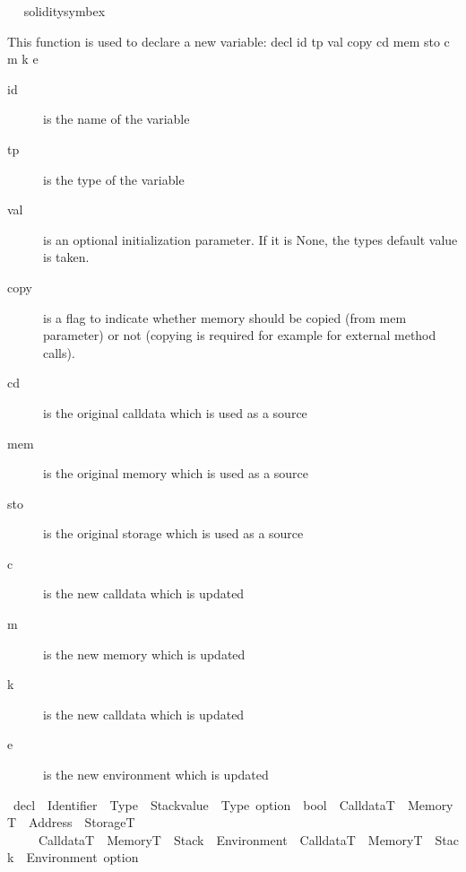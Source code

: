 \begin{isabellebody}
\isadelimproof
\ %
\endisadelimproof
%
\isatagproof
{}\isamarkupfalse%
\ solidity{\isacharunderscore}{\kern0pt}symbex%
\endisatagproof
{\isafoldproof}%
%
\isadelimproof
%
\endisadelimproof
%
\isadelimdocument
%
\endisadelimdocument
%
\isatagdocument
%
\isamarkuptrue%
%
\endisatagdocument
{\isafolddocument}%
%
\isadelimdocument
%
\endisadelimdocument
%
\begin{isamarkuptext}%
This function is used to declare a new variable: decl id tp val copy cd mem sto c m k e
\begin{description}
  \item[id] is the name of the variable
  \item[tp] is the type of the variable
  \item[val] is an optional initialization parameter. If it is None, the types default value is taken.
  \item[copy] is a flag to indicate whether memory should be copied (from mem parameter) or not (copying is required for example for external method calls).
  \item[cd] is the original calldata which is used as a source
  \item[mem] is the original memory which is used as a source
  \item[sto] is the original storage which is used as a source
  \item[c] is the new calldata which is updated
  \item[m] is the new memory which is updated
  \item[k] is the new calldata which is updated
  \item[e] is the new environment which is updated
\end{description}%
\end{isamarkuptext}\isamarkuptrue%
\isamarkupfalse%
\ decl\ {\isacharcolon}{\kern0pt}{\isacharcolon}{\kern0pt}\ {\isachardoublequoteopen}Identifier\ {\isasymRightarrow}\ Type\ {\isasymRightarrow}\ {\isacharparenleft}{\kern0pt}Stackvalue\ {\isacharasterisk}{\kern0pt}\ Type{\isacharparenright}{\kern0pt}\ option\ {\isasymRightarrow}\ bool\ {\isasymRightarrow}\ CalldataT\ {\isasymRightarrow}\ MemoryT\ {\isasymRightarrow}\ {\isacharparenleft}{\kern0pt}Address\ {\isasymRightarrow}\ StorageT{\isacharparenright}{\kern0pt}\isanewline
\ \ \ \ {\isasymRightarrow}\ CalldataT\ {\isasymtimes}\ MemoryT\ {\isasymtimes}\ Stack\ {\isasymtimes}\ Environment\ {\isasymRightarrow}\ {\isacharparenleft}{\kern0pt}CalldataT\ {\isasymtimes}\ MemoryT\ {\isasymtimes}\ Stack\ {\isasymtimes}\ Environment{\isacharparenright}{\kern0pt}\ option{\isachardoublequoteclose}\isanewline

\end{isabellebody}
